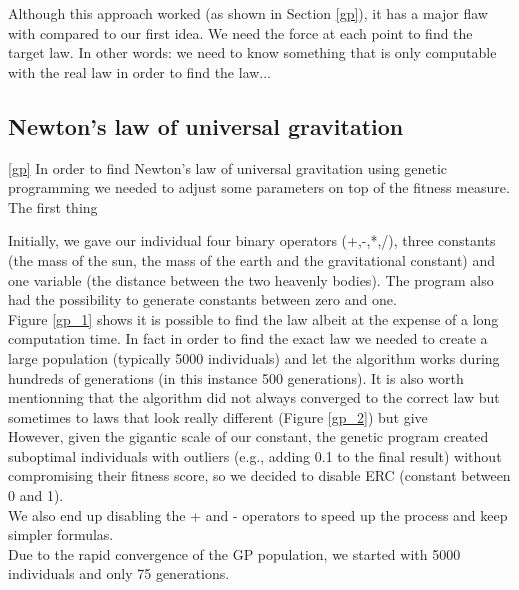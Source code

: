 Although this approach worked (as shown in Section \ref{gp}), it
has a major flaw with compared to our first idea. We need the force at each
point to find
the target law. In other words: we need to know something that is only
computable with the
real law in order to find the law...\\

\subsection{Newton's law of universal gravitation}
\ref{gp}
In order to find Newton's law of universal gravitation using genetic
programming we needed to adjust some parameters on top of the fitness
measure.\\

The first thing

Initially, we gave our individual four binary operators (+,-,*,/), three
constants (the mass of the sun, the mass of the earth and the gravitational
constant) and
one variable (the distance between the two heavenly bodies). The program also
had the possibility to generate constants between zero and one.\\

Figure \ref{gp_1} shows it is possible to find the law albeit at the expense of
a long computation time. In fact in order to find the exact law we needed to
create a large population (typically 5000 individuals) and let the algorithm
works during hundreds of generations (in this instance 500 generations). It is also worth mentionning that the algorithm did not always converged to the correct law but sometimes to laws that look really different (Figure \ref{gp_2}) but give \\

However, given the
gigantic scale of our constant, the genetic program created suboptimal individuals with outliers
(e.g., adding 0.1 to the final result) without compromising their fitness
score, so we decided to disable ERC (constant between 0 and 1).\\
We also end up disabling the + and - operators to speed up the process and keep
simpler formulas.\\

Due to the rapid convergence of the GP population, we started with 5000
individuals and only 75 generations.\\


